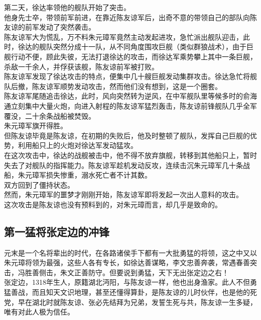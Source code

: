 \begin{multicols}{\theparacolNo}
第二天，徐达率领他的舰队开始了突击。\\

他身先士卒，带领前军前进，在靠近陈友谅军后，出奇不意的带领自己的部队向陈友谅的前军发动了突然袭击。\\

陈友谅军大为慌乱，万不料朱元璋军竟然主动发起进攻，急忙派出舰队迎击，此时，徐达的舰队突然分成十一队，从不同角度围攻巨舰（类似群狼战术），由于巨舰行动不便，顾此失彼，无法打退徐达的攻击，而徐达军乘势攀上其中一条巨舰，杀敌一千余人，并俘获该舰，陈友谅前军被打败。\\

陈友谅军发现了徐达攻击的特点，便集中几十艘巨舰发动集群攻击。徐达急忙将舰队后撤，陈友谅军顺势发动攻击，然而他们没有想到，这是一个圈套。\\

陈友谅军尾随追击徐达，此时，风向突然转为逆风，在中军舰队里等候多时的俞海通立刻集中大量火炮，向进入射程的陈友谅军猛烈轰击，陈友谅前锋舰队几乎全军覆没，二十余条战船被焚毁。\\

朱元璋军旗开得胜。\\

但陈友谅毕竟是陈友谅，在初期的失败后，他及时整顿了舰队，发挥自己巨舰的优势，利用船只上的火炮对徐达军发动猛攻。\\

在这次攻击中，徐达的战舰被击中，他不得不放弃旗舰，转移到其他船只上，暂时失去了对舰队的指挥能力。陈友谅军趁机发动反攻，连续击沉朱元璋军几十条战船，朱元璋军损失惨重，溺水死亡者不计其数。\\

双方回到了僵持状态。\\

然而，朱元璋军的噩梦才刚刚开始，陈友谅军即将发起一次出人意料的攻击。\\

这次攻击是陈友谅也没有预料到的，对朱元璋而言，却几乎是致命的。\\

\subsection{第一猛将张定边的冲锋}
元末是一个名将辈出的时代，在各路诸侯手下都有一大批勇猛的将领，这之中又以朱元璋将领为最强，这些人各有专长，如徐达善谋略，李文忠善奔袭，常遇春善突击，冯胜善侧击，朱文正善防守。但要说到勇猛，天下无出张定边之右！\\

张定边，1318年生人，原籍湖北沔阳，与陈友谅一样，他也出身渔家。此人不但勇猛善战，而且知天文识地理，甚至还懂得算卦，是陈友谅的儿时伙伴，也是他的死党，早在湖北时就陈友谅、张必先结拜为兄弟，发誓生死与共，陈友谅一生多疑，唯有对此人极为信任。\\


\end{multicols}
